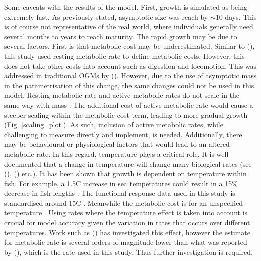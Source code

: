 \documentclass[a4paper, 11pt, hidelinks]{article} %
\begin{document}
	Some caveats with the results of the model.  First, growth is simulated as being extremely fast.  As previously stated, asymptotic size was reach by $\sim$10 days.  This is of course not representative of the real world, where individuals generally need several months to years to reach maturity.	
	The rapid growth may be due to several factors.  First is that metabolic cost may be underestimated.  Similar to \citeauthor{West2001} (\citeyear{West2001}), this study used resting metabolic rate to define metabolic costs.  However, this does not take other costs into account such as digestion and locomotion.
	This was addressed in traditional OGMs by \citeauthor{Hou2008} (\citeyear{Hou2008}).  However, due to the use of asymptotic mass in the parametrisation of this change, the same changes could not be used in this model.  Resting metabolic rate and active metabolic rates do not scale in the same way with mass \parencite{Gillooly2001, Weibel2004}.  The additional cost of active metabolic rate would cause a steeper scaling within the metabolic cost term, leading to more gradual growth (Fig. \ref{scaling_plot}). 
	As such, inclusion of active metabolic rates, while challenging to measure directly and implement, is needed.
	Additionally, there may be behavioural or physiological factors that would lead to an altered metabolic rate.  
	In this regard, temperature plays a critical role.  It is well documented that a change in temperature will change many biological rates  (see \citeauthor{Peters1983} (\citeyear{Peters1983}), \citeauthor{Gillooly2001} (\citeyear{Gillooly2001}) etc.).  
	It has been shown that growth is dependent on temperature within fish. %
	For example, a 1.5\textdegree{}C increase in sea temperatures could result in a 15\% decrease in fish lengths \parencite{VanRijn2017}. %
	The functional response data used in this study is standardised around 15\textdegree{}C \parencite{Pawar2012}.
	Meanwhile the metabolic cost is for an unspecified temperature \parencite{Peters1983}.  Using rates where the temperature effect is taken into account is crucial for model accuracy given the variation in rates that occurs over different temperatures.  Work such as \citeauthor{Barneche2014} (\citeyear{Barneche2014}) has investigated this effect, however the estimate for metabolic rate is several orders of magnitude lower than what was reported by \citeauthor{Peters1983} (\citeyear{Peters1983}), which is the rate used in this study.  Thus further investigation is required.  %
	
\end{document}
